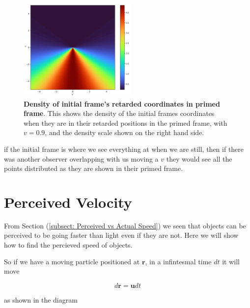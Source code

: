 \begin{figure}[H]
	\label{fig: retarded coordinate transform}
\end{figure}

\begin{figure}[H]
	\centering
	\includegraphics[height=5cm]{images/pdf/coord_transform_Retarded_Coordinate_Density_Transform.pdf}
	\caption{\textbf{Density of initial frame's retarded coordinates in primed frame}. This shows the density of the initial frames coordinates when they are in their retarded positions in the primed frame, with $v=0.9$, and the density scale shown on the right hand side.}
	\label{fig: Density of initial frame's retarded coordinates in primed frame}
\end{figure}

if the initial frame is where we see everything at when we are still, then if there was another observer overlapping with us moving a ${v}$ they would see all the points distributed as they are shown in their primed frame.

\section{Perceived Velocity} \label{sect: Perceived Velocity}


From Section (\ref{subsect: Perceived vs Actual Speed}) we seen that objects can be perceived to be going faster than light even if they are not.
Here we will show how to find the percieved speed of objects.

So if we have a moving particle positioned at $\mathbf{r}$, in a infintesmal time ${dt}$ it will move

\begin{equation}
	d\mathbf{r}= \mathbf{u} {dt}
\end{equation}

as shown in the diagram

